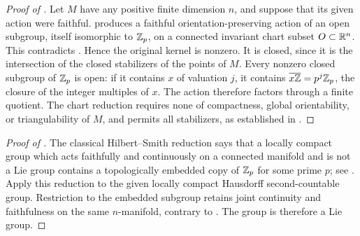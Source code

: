 \begin{proof}[Proof of ]
Let $M$ have any positive finite dimension $n$, and suppose that its
given action were faithful.   produces a faithful
orientation-preserving action of an open subgroup, itself isomorphic
to $\mathbb Z_p$, on a connected invariant chart subset $O\subset\mathbb R^n$.
This contradicts .  Hence the original kernel
is nonzero.  It is closed, since it is the intersection of the closed
stabilizers of the points of $M$.  Every nonzero closed subgroup of
$\mathbb Z_p$ is open: if it contains $x$ of valuation $j$, it contains
$\overline{x\mathbb Z}=p^j\mathbb Z_p$, the closure of the integer multiples of $x$.
The action therefore factors through a finite quotient.  The chart reduction
requires none of compactness, global orientability, or triangulability
of $M$, and permits all stabilizers, as established in
.
\end{proof}

\begin{proof}[Proof of ]
The classical Hilbert--Smith reduction says that a locally compact
group which acts faithfully and continuously on a connected manifold
and is not a Lie group contains a topologically embedded copy of
$\mathbb Z_p$ for some prime $p$; see \cite[Introduction, p.~1]{Pardon2013}.
Apply this reduction to the given locally compact Hausdorff
second-countable group.  Restriction to the embedded subgroup retains
joint continuity and faithfulness on the same $n$-manifold, contrary
to .  The group is therefore a Lie group.
\end{proof}
